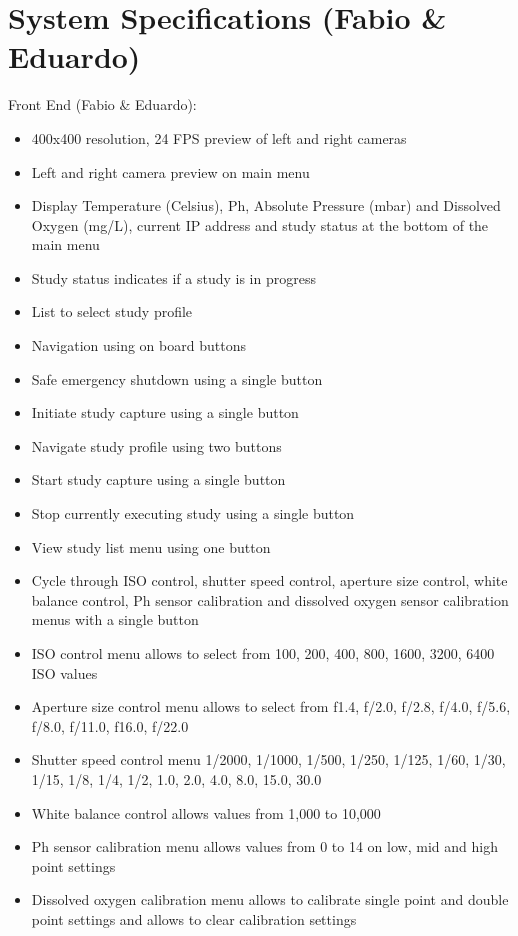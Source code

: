 \section{System Specifications (Fabio \& Eduardo)}
Front End (Fabio \& Eduardo):
\begin{itemize}
	\item 400x400 resolution, 24 FPS preview of left and right cameras
	\item Left and right camera preview on main menu
	\item Display Temperature (Celsius), Ph, Absolute Pressure (mbar) and Dissolved Oxygen (mg/L), current IP address and study status at the bottom of the main menu
	\item Study status indicates if a study is in progress
	\item List to select study profile
	\item Navigation using on board buttons
	\item Safe emergency shutdown using a single button
	\item Initiate study capture using a single button
	\item Navigate study profile using two buttons
	\item Start study capture using a single button
	\item Stop currently executing study using a single button
	\item View study list menu using one button
	\item Cycle through ISO control, shutter speed control, aperture size control, white balance control, Ph sensor calibration and dissolved oxygen sensor calibration menus with a single button
	\item ISO control menu allows to select from 100, 200, 400, 800, 1600, 3200, 6400 ISO values
	\item Aperture size control menu allows to select from f1.4, f/2.0, f/2.8, f/4.0, f/5.6, f/8.0, f/11.0, f16.0, f/22.0
	\item Shutter speed control menu 1/2000, 1/1000, 1/500, 1/250, 1/125, 1/60, 1/30, 1/15, 1/8, 1/4, 1/2, 1.0, 2.0, 4.0, 8.0, 15.0, 30.0
	\item White balance control allows values from 1,000 to 10,000
	\item Ph sensor calibration menu allows values from 0 to 14 on low, mid and high point settings
	\item Dissolved oxygen calibration menu allows to calibrate single point and double point settings and allows to clear calibration settings
\end{itemize}
